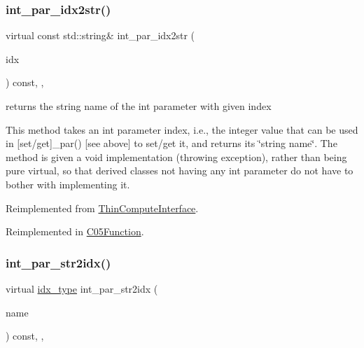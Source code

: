 \subsubsection{\texorpdfstring{int\+\_\+par\+\_\+idx2str()}{int\_par\_idx2str()}}
{\footnotesize\ttfamily virtual const std\+::string\& int\+\_\+par\+\_\+idx2str (\begin{DoxyParamCaption}\item[{const \mbox{\hyperlink{class_s_m_spp__di__unipi__it_1_1_thin_compute_interface_aa3d710629ad8c434286726ad810c3b47}{idx\+\_\+type}}}]{idx }\end{DoxyParamCaption}) const\hspace{0.3cm}{\ttfamily [inline]}, {\ttfamily [override]}, {\ttfamily [virtual]}}



returns the string name of the int parameter with given index 

This method takes an int parameter index, i.\+e., the integer value that can be used in \mbox{[}set/get\mbox{]}\+\_\+par() \mbox{[}see above\mbox{]} to set/get it, and returns its \char`\"{}string name\char`\"{}. The method is given a void implementation (throwing exception), rather than being pure virtual, so that derived classes not having any int parameter do not have to bother with implementing it. 

Reimplemented from \mbox{\hyperlink{class_s_m_spp__di__unipi__it_1_1_thin_compute_interface_a3d3d1ca3218d2d640614ed75a960ef01}{Thin\+Compute\+Interface}}.



Reimplemented in \mbox{\hyperlink{class_s_m_spp__di__unipi__it_1_1_c05_function_a61e973f39747f63b8f56d97cc62e32ce}{C05\+Function}}.

\mbox{\label{class_s_m_spp__di__unipi__it_1_1_function_ae281b6699b0707a5cdc1e82b76d26c09}} 
\subsubsection{\texorpdfstring{int\+\_\+par\+\_\+str2idx()}{int\_par\_str2idx()}}
{\footnotesize\ttfamily virtual \mbox{\hyperlink{class_s_m_spp__di__unipi__it_1_1_thin_compute_interface_aa3d710629ad8c434286726ad810c3b47}{idx\+\_\+type}} int\+\_\+par\+\_\+str2idx (\begin{DoxyParamCaption}\item[{const std\+::string \&}]{name }\end{DoxyParamCaption}) const\hspace{0.3cm}{\ttfamily [inline]}, {\ttfamily [override]}, {\ttfamily [virtual]}}



